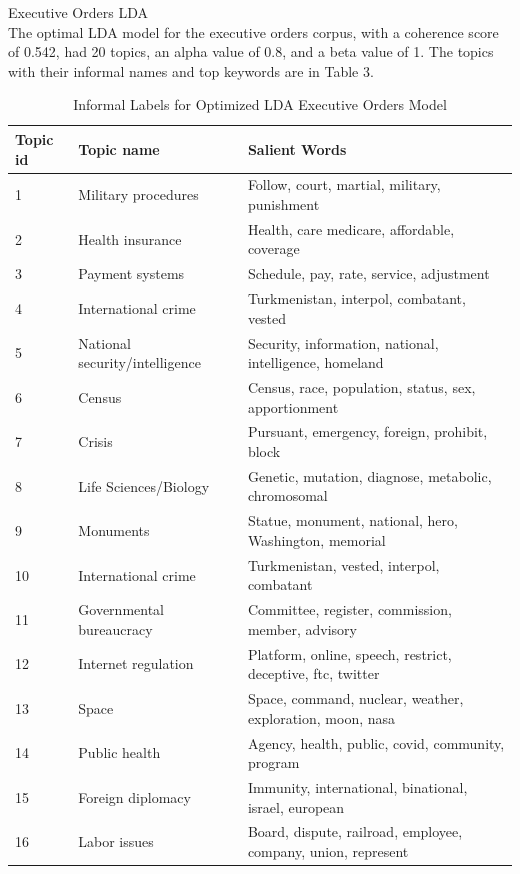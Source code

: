 \documentclass{article}
\begin{document}
{{Executive Orders LDA \\
The optimal LDA model for the executive orders corpus, with a coherence score of 0.542, had 20 topics, an alpha value of 0.8, and a beta value of 1. The topics with their informal names and top keywords are in Table 3. 

\begin{table}[H]
	\caption{Informal Labels for Optimized LDA Executive Orders Model}
	\centering
	\begin{tabular}{lll}
		\toprule
		\midrule
		Topic id  & Topic name & Salient Words \\
		\midrule
		\midrule
		1 & Military procedures & Follow, court, martial, military, punishment \\
		\midrule
		2 & Health insurance & Health, care medicare, affordable, coverage \\
		\midrule
		3 & Payment systems & Schedule, pay, rate, service, adjustment \\
		\midrule
		4 & International crime & Turkmenistan, interpol, combatant, vested  \\
		\midrule
		5 & National security/intelligence & Security, information, national, intelligence, homeland \\
		\midrule
		6 & Census & Census, race, population, status, sex, apportionment\\
		\midrule
		7 & Crisis & Pursuant, emergency, foreign, prohibit, block\\
		\midrule
		8 & Life Sciences/Biology & Genetic, mutation, diagnose, metabolic, chromosomal\\
		\midrule
		9 & Monuments & Statue, monument, national, hero, Washington, memorial\\
		\midrule
		10 & International crime & Turkmenistan, vested, interpol, combatant\\
		\midrule
		11 & Governmental bureaucracy & Committee, register, commission, member, advisory\\
		\midrule
		12 & Internet regulation & Platform, online, speech, restrict, deceptive, ftc, twitter\\
		\midrule
		13 & Space & Space, command, nuclear, weather, exploration, moon, nasa\\
		\midrule
		14 & Public health & Agency, health, public, covid, community, program\\
		\midrule
		15 & Foreign diplomacy & Immunity, international, binational, israel, european\\
		\midrule
		16 & Labor issues & Board, dispute, railroad, employee, company, union, represent\\

\end{tabular}
\end{table}}}
\end{document}
